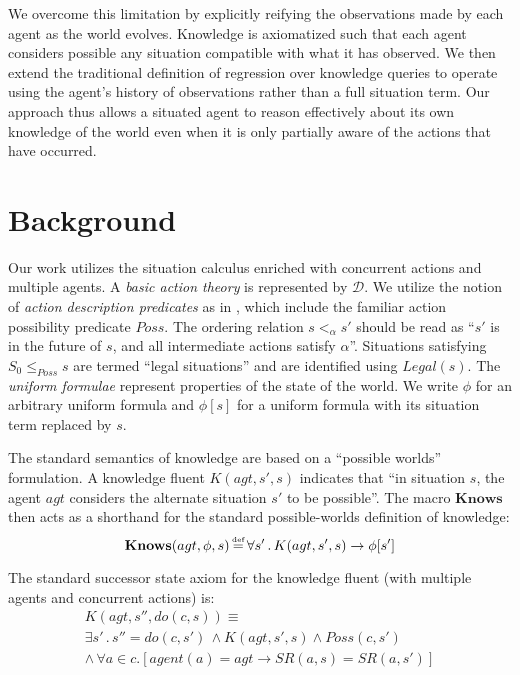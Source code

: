 \documentclass{ifaamas-submission}
\newcommand{\isdef}{\hbox{$\stackrel{\mbox{\tiny def}}{=}$}}
\begin{document}
We overcome this limitation by explicitly reifying the observations made by
each agent as the world evolves. Knowledge is axiomatized such that each agent
considers possible any situation compatible with what it has observed.
We then extend the traditional definition of regression
over knowledge queries to operate using the agent's history of
observations rather than a full situation term.  Our approach thus
allows a situated agent to reason effectively about its own knowledge of
the world even when
it is only partially aware of the actions that have occurred.

\section{Background}

Our work utilizes the situation calculus \cite{pirri99contributions_sitcalc} 
enriched with concurrent actions \cite{scherl03conc_knowledge} and multiple
agents. A \emph{basic action theory} is represented by $\mathcal{D}$.
We utilize the notion of \emph{action description predicates} as in
\cite{kelly07sc_persistence}, which include the familiar action possibility
predicate $Poss$.
The ordering relation $s <_{\alpha} s'$ should be read as {}``$s'$ is in
the future of $s$, and all intermediate actions satisfy $\alpha$''.
Situations satisfying $S_0 \leq_{Poss} s$ are termed {}``legal situations''
and are identified using $Legal(s)$.
The \emph{uniform formulae} \cite{pirri99contributions_sitcalc}
 represent properties of the state of the world.
We write $\phi$ for an arbitrary uniform
formula and $\phi[s]$ for a uniform formula with its situation
term replaced by $s$.

The standard semantics of knowledge 
\cite{scherl03sc_knowledge,scherl03conc_knowledge} are
based on a {}``possible worlds'' formulation. A knowledge fluent
$K(agt,s',s)$ indicates that {}``in situation $s$, the
agent $agt$ considers the alternate situation $s'$ to be possible''.
The macro $\mathbf{Knows}$ then acts as a shorthand for
the standard possible-worlds definition of knowledge:
\begin{equation}
\mathbf{Knows}(agt,\phi,s)\,\isdef\,\forall s'\,.\, K(agt,s',s)\rightarrow\phi[s']\label{eqn:knows_def}
\end{equation}

The standard successor state axiom for the knowledge fluent (with
multiple agents and concurrent actions) is:
\begin{multline}
K(agt,s'',do(c,s))\equiv\\
\exists s'\,.\, s''=do(c,s')\,\wedge K(agt,s',s)\wedge Poss(c,s')\\
\wedge\,\forall a\in c.\left[agent(a)=agt\rightarrow SR(a,s)=SR(a,s')\right]\label{eqn:k_ssa_standard}
\end{multline}
 
\end{document}
